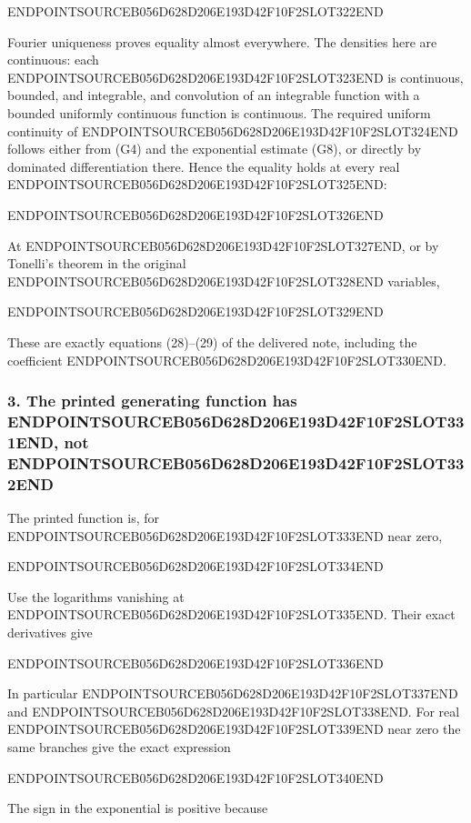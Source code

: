 ENDPOINTSOURCEB056D628D206E193D42F10F2SLOT322END

Fourier uniqueness proves equality almost everywhere. The densities here are continuous: each ENDPOINTSOURCEB056D628D206E193D42F10F2SLOT323END is continuous, bounded, and integrable, and convolution of an integrable function with a bounded uniformly continuous function is continuous. The required uniform continuity of ENDPOINTSOURCEB056D628D206E193D42F10F2SLOT324END follows either from (G4) and the exponential estimate (G8), or directly by dominated differentiation there. Hence the equality holds at every real ENDPOINTSOURCEB056D628D206E193D42F10F2SLOT325END:

ENDPOINTSOURCEB056D628D206E193D42F10F2SLOT326END

At ENDPOINTSOURCEB056D628D206E193D42F10F2SLOT327END, or by Tonelli's theorem in the original ENDPOINTSOURCEB056D628D206E193D42F10F2SLOT328END variables,

ENDPOINTSOURCEB056D628D206E193D42F10F2SLOT329END

These are exactly equations (28)--(29) of the delivered note, including the coefficient ENDPOINTSOURCEB056D628D206E193D42F10F2SLOT330END.

\subsubsection{\texorpdfstring{3. The printed generating function has ENDPOINTSOURCEB056D628D206E193D42F10F2SLOT331END, not ENDPOINTSOURCEB056D628D206E193D42F10F2SLOT332END}{3. The printed generating function has , not }}\label{endpoint-gamma_review--the-printed-generating-function-has-x-not--x}

The printed function is, for ENDPOINTSOURCEB056D628D206E193D42F10F2SLOT333END near zero,

ENDPOINTSOURCEB056D628D206E193D42F10F2SLOT334END

Use the logarithms vanishing at ENDPOINTSOURCEB056D628D206E193D42F10F2SLOT335END. Their exact derivatives give

ENDPOINTSOURCEB056D628D206E193D42F10F2SLOT336END

In particular ENDPOINTSOURCEB056D628D206E193D42F10F2SLOT337END and ENDPOINTSOURCEB056D628D206E193D42F10F2SLOT338END. For real ENDPOINTSOURCEB056D628D206E193D42F10F2SLOT339END near zero the same branches give the exact expression

ENDPOINTSOURCEB056D628D206E193D42F10F2SLOT340END

The sign in the exponential is positive because

